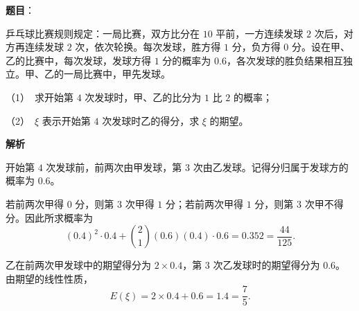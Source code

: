\begin{answer}

\textbf{题目}：

乒乓球比赛规则规定：一局比赛，双方比分在 $10$ 平前，一方连续发球 $2$ 次后，对方再连续发球 $2$ 次，依次轮换。每次发球，胜方得 $1$ 分，负方得 $0$ 分。设在甲、乙的比赛中，每次发球，发球方得 $1$ 分的概率为 $0.6$，各次发球的胜负结果相互独立。甲、乙的一局比赛中，甲先发球。

（1）　求开始第 $4$ 次发球时，甲、乙的比分为 $1$ 比 $2$ 的概率；

（2）　$\xi$ 表示开始第 $4$ 次发球时乙的得分，求 $\xi$ 的期望。

\textbf{解析}

开始第 $4$ 次发球前，前两次由甲发球，第 $3$ 次由乙发球。记得分归属于发球方的概率为 $0.6$。


若前两次甲得 $0$ 分，则第 $3$ 次甲得 $1$ 分；若前两次甲得 $1$ 分，则第 $3$ 次甲不得分。因此所求概率为
\nopagebreak[4]
\[
(0.4)^2\cdot0.4+\binom21(0.6)(0.4)\cdot0.6
=0.352=\frac{44}{125}.
\]


乙在前两次甲发球中的期望得分为 $2\times0.4$，第 $3$ 次乙发球时的期望得分为 $0.6$。由期望的线性性质，
\nopagebreak[4]
\[
E(\xi)=2\times0.4+0.6=1.4=\frac75.
\]



\end{answer}

